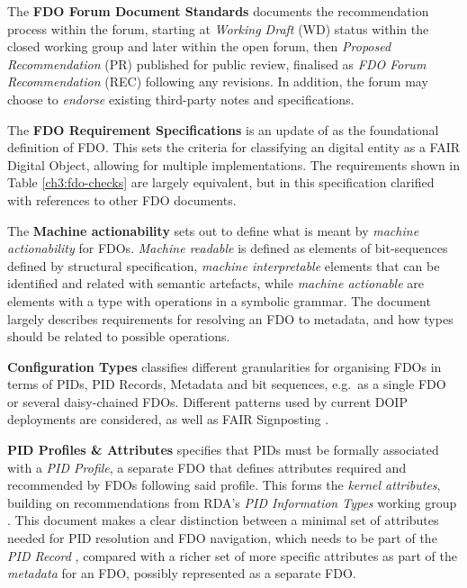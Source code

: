 The \textbf{FDO Forum Document Standards} \cite{fdo-DocProcessStd} documents the recommendation process within the forum, starting at \emph{Working Draft} (WD) status within the closed working group and later within the open forum, then \emph{Proposed Recommendation} (PR) published for public review, finalised as \emph{FDO Forum Recommendation} (REC) following any revisions. In addition, the forum may choose to \emph{endorse} existing third-party notes and specifications.

The \textbf{FDO Requirement Specifications} \cite{fdo-RequirementSpec} is an update of \cite{bonino2019} as the foundational definition of FDO. This sets the criteria for classifying an digital entity as a FAIR Digital Object, allowing for multiple implementations. The requirements shown in Table \vref{ch3:fdo-checks} are largely equivalent, but in this specification clarified with references to other FDO documents.

The \textbf{Machine actionability} \cite{fdo-MachineActionDef} sets out to define what is meant by \emph{machine actionability} for FDOs. \emph{Machine readable} is defined as elements of bit-sequences defined by structural specification, \emph{machine interpretable} elements that can be identified and related with semantic artefacts, while \emph{machine actionable} are elements with a type with operations in a symbolic grammar. The document largely describes requirements for resolving an FDO to metadata, and how types should be related to possible operations.

\textbf{Configuration Types} \cite{fdo-ConfigurationTypes} classifies different granularities for organising FDOs in terms of PIDs, PID Records, Metadata and bit sequences, e.g.~as a single FDO or several daisy-chained FDOs. Different patterns used by current DOIP deployments are considered, as well as FAIR Signposting \cite{Van de Sompel 2022}.

\textbf{PID Profiles \& Attributes} \cite{fdo-PIDProfileAttributes} specifies that PIDs must be formally associated with a \emph{PID Profile}, a separate FDO that defines attributes required and recommended by FDOs following said profile. This forms the \emph{kernel attributes}, building on recommendations from RDA's \emph{PID Information Types} working group \cite{weigelRDARecommendationPID2018}. This document makes a clear distinction between a minimal set of attributes needed for PID resolution and FDO navigation, which needs to be part of the \emph{PID Record} \cite{islam_2023}, compared with a richer set of more specific attributes as part of the \emph{metadata} for an FDO, possibly represented as a separate FDO.

